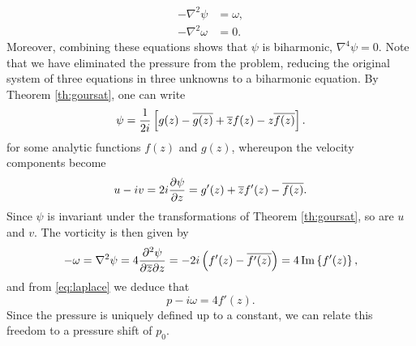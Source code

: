 \begin{subequations}
\begin{align}
-\nabla^2\psi &= \omega,\\
-\nabla^2\omega &= 0.\label{eq:laplace}
\end{align}
\end{subequations}
Moreover, combining these equations shows that $\psi$ is biharmonic, $\nabla^4 \psi=0$. Note that we have eliminated the pressure from the problem, reducing the original system of three equations in three unknowns to a biharmonic equation. By Theorem \ref{th:goursat}, one can write
\begin{equation}
\psi = \frac{1}{2i} \left[g(z) - {\overline{g(z)}} + {\overline{z}}f(z) - z{\overline{f(z)}}\right].
\end{equation}
for some analytic functions $f(z)$ and $g(z)$, whereupon the velocity components become
\begin{equation}
u-iv = 2i\frac{\partial \psi}{\partial z} = g'(z) + {\overline{z}} f'(z) - {\overline{f(z)}}.
\end{equation}
Since $\psi$ is invariant under the transformations of Theorem \ref{th:goursat}, so are $u$ and $v$. The vorticity is then given by
\begin{equation}
-\omega = \nabla^2 \psi =4\frac{\partial^2\psi}{\partial {\overline{z}}\partial z} = -2i \left( f'(z) - {\overline{f'(z)}}\right) = 4\Im\left\{f'(z)\right\},
\end{equation}
and from \eqref{eq:laplace} we deduce that
\begin{equation}
p-i\omega = 4 f'(z).
\end{equation}
Since the pressure is uniquely defined up to a constant, we can relate this freedom to a pressure shift of $p_0$. 

